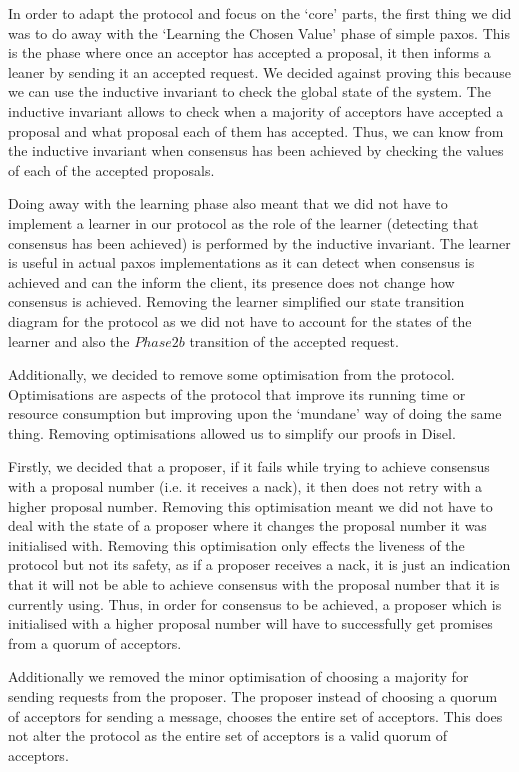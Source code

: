 In order to adapt the protocol and focus on the `core' parts, the first thing
we did was to do away with the `Learning the Chosen Value' phase of simple paxos.
This is the phase where once an acceptor has accepted a proposal, it then informs
a leaner by sending it an accepted request. We decided against proving this
because we can use the inductive invariant to check the global state of the system.
The inductive invariant allows to check when a majority of acceptors have
accepted a proposal and what proposal each of them has accepted. Thus, we can know
from the inductive invariant when consensus has been achieved by checking the values
of each of the accepted proposals.

Doing away with the learning phase also meant that we did not have to implement
a learner in our protocol as the role of the learner (detecting that consensus
has been achieved) is performed by the inductive invariant.
The learner is useful in actual paxos implementations as
it can detect when consensus is achieved and can the inform the client, its
presence does not change how consensus is achieved. Removing the learner simplified
our state transition diagram for the protocol as we did not have to account
for the states of the learner and also the $Phase 2b$ transition of the
accepted request.

Additionally, we decided to remove some optimisation from the protocol.
Optimisations are aspects of the protocol that improve its running time or
resource consumption but improving upon the `mundane' way of doing the same
thing. Removing optimisations allowed us to simplify our proofs in Disel.

Firstly, we decided that a proposer, if it fails while trying to achieve
consensus with a proposal number (i.e. it receives a nack), it then does not
retry with a higher proposal number. Removing this optimisation meant we did not
have to deal with the state of a proposer where it changes the proposal number it
was initialised with. Removing this optimisation only
effects the liveness of the protocol but not its safety, as if a proposer
receives a nack, it is just an indication that it will not be able to achieve
consensus with the proposal number that it is currently using. Thus, in order
for consensus to be achieved, a proposer which is initialised with a higher
proposal number will have to successfully get promises from a quorum of acceptors.

Additionally we removed the minor optimisation of choosing a majority for
sending requests from the proposer. The proposer instead of choosing a
quorum of acceptors for sending a message, chooses the entire set of acceptors.
This does not alter the protocol as the entire set of acceptors is a valid
quorum of acceptors.

